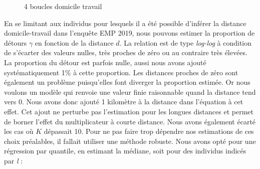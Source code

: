 \documentclass[
  9pt,
  a4paper,
  DIV=11]{scrreprt}
\begin{document}
\begin{figure}

\caption{\label{fig-boucles}4 boucles domicile travail}


\end{figure}%

En se limitant aux individus pour lesquels il a été possible d'inférer
la distance domicile-travail dans l'enquête EMP 2019, nous pouvons
estimer la proportion de détours \(\gamma\) en fonction de la distance
\(d\). La relation est de type \emph{log-log} à condition de s'écarter
des valeurs nulles, très proches de zéro ou au contraire très élevées.
La proportion du détour est parfois nulle, aussi nous avons ajouté
systématiquement 1\% à cette proportion. Les distances proches de zéro
sont également un problème puisqu'elles font diverger la proportion
estimée. Or nous voulons un modèle qui renvoie une valeur finie
raisonnable quand la distance tend vers 0. Nous avons donc ajouté 1
kilomètre à la distance dans l'équation à cet effet. Cet ajout ne
perturbe pas l'estimation pour les longues distances et permet de borner
l'effet du multiplicateur à courte distance. Nous avons également écarté
les cas où \(K\) dépassait 10. Pour ne pas faire trop dépendre nos
estimations de ces choix préalables, il fallait utiliser une méthode
robuste. Nous avons opté pour une régression par quantile, en estimant
la médiane, soit pour des individus indicés par \emph{l} :
\end{document}
